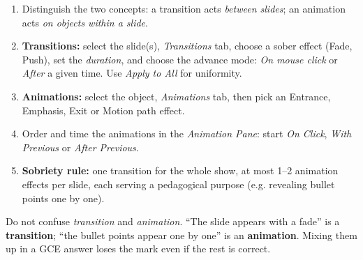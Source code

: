 \documentclass[11pt]{article}
\newcommand{\cle}[1]{{\popxbold\color{popdark}#1}}
\begin{document}
\begin{methode}
\begin{enumerate}
\item Distinguish the two concepts: a \cle{transition} acts \emph{between slides}; an \cle{animation} acts \emph{on objects within a slide}.
\item \textbf{Transitions:} select the slide(s), \emph{Transitions} tab, choose a sober effect (Fade, Push), set the \emph{duration}, and choose the advance mode: \emph{On mouse click} or \emph{After} a given time. Use \emph{Apply to All} for uniformity.
\item \textbf{Animations:} select the object, \emph{Animations} tab, then pick an Entrance, Emphasis, Exit or Motion path effect.
\item Order and time the animations in the \emph{Animation Pane}: start \emph{On Click}, \emph{With Previous} or \emph{After Previous}.
\item \textbf{Sobriety rule:} one transition for the whole show, at most 1--2 animation effects per slide, each serving a pedagogical purpose (e.g. revealing bullet points one by one).
\end{enumerate}
\end{methode}

\begin{attention}
Do not confuse \emph{transition} and \emph{animation}. ``The slide appears with a fade'' is a \textbf{transition}; ``the bullet points appear one by one'' is an \textbf{animation}. Mixing them up in a GCE answer loses the mark even if the rest is correct.
\end{attention}
\end{document}
